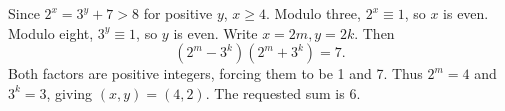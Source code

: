 Since $2^x=3^y+7>8$ for positive $y$, $x\ge4$. Modulo three, $2^x\equiv1$, so $x$ is even. Modulo eight, $3^y\equiv1$, so $y$ is even. Write $x=2m,y=2k$. Then
\[(2^m-3^k)(2^m+3^k)=7.\]
Both factors are positive integers, forcing them to be 1 and 7. Thus $2^m=4$ and $3^k=3$, giving $(x,y)=(4,2)$. The requested sum is $\boxed6$.
